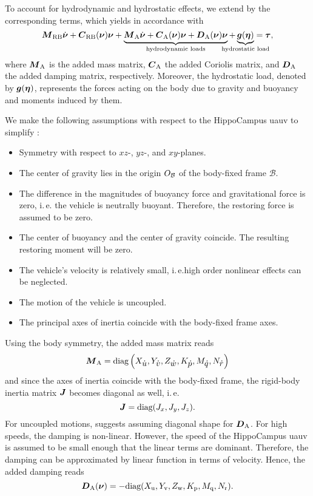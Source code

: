 To account for hydrodynamic and hydrostatic effects, we extend  by the corresponding terms, which yields in accordance with \cite{Fossen11}
\begin{equation}
	\label{eq:6dof-equation-of-motion}
	\Mrigid \nubp + \Crigid(\nub) \nub +
	\underbrace{
		\Madded \nubp +
		\Cadded(\nub) \nub +
		\Dadded(\nub) \nub
	}_\text{hydrodynamic loads}
	+ 
	\underbrace{
		\gb(\etab)
	}_\text{\makebox[0pt]{hydrostatic load}}
	= \taub
	,
\end{equation}
where $\mbox{$\bm{M}$}_\text{A}$ is the added mass matrix, $\mbox{$\bm{C}$}_\text{A}$ the added Coriolis matrix, and $\mbox{$\bm{D}$}_\text{A}$ the added damping matrix, respectively.
Moreover, the hydrostatic load, denoted by $\mbox{$\bm{g}$}(\mbox{$\bm{\eta}$})$, represents the forces acting on the body due to gravity and buoyancy and moments induced by them.

We make the following assumptions with respect to the HippoCampus \ac{uauv} to simplify :
\begin{itemize}
	\item Symmetry with respect to $xz$-, $yz$-, and $xy$-planes.
	\item The center of gravity lies in the origin $O_{\mathcal{B}}$ of the body-fixed frame $\mathcal{B}$.
	\item The difference in the magnitudes of buoyancy force and gravitational force is zero, i.\,e. the vehicle is neutrally buoyant. Therefore, the restoring force is assumed to be zero.
	\item The center of buoyancy and the center of gravity coincide. The resulting restoring moment will be zero.
	\item The vehicle's velocity is relatively small, i.\,e.high order nonlinear effects can be neglected.
	\item The motion of the vehicle is uncoupled.
	\item The principal axes of inertia coincide with the body-fixed frame axes.
\end{itemize}

Using the body symmetry, the added mass matrix reads %
\begin{equation}
	\mbox{$\bm{M}$}_\text{A} =
	\text{diag}\left(X_{\mbox{$\dot{u}$}}, Y_{\mbox{$\dot{v}$}}, Z_{\mbox{$\dot{w}$}}, K_{\mbox{$\dot{p}$}}, M_{\mbox{$\dot{q}$}}, N_{\mbox{$\dot{r}$}}\right)
\end{equation}
and since the axes of inertia coincide with the body-fixed frame, the rigid-body inertia matrix $\mbox{$\bm{J}$}$ becomes diagonal as well, i.\,e.
\begin{equation}
	\mbox{$\bm{J}$} = \text{diag}(J_x, J_y, J_z)
	.
\end{equation}
For uncoupled motions, \cite{Fossen11} suggests assuming diagonal shape for $\mbox{$\bm{D}$}_\text{A}$. For high speeds, the damping is non-linear. However, the speed of the HippoCampus \ac{uauv} is assumed to be small enough that the linear terms are dominant. Therefore, the damping can be approximated by linear function in terms of velocity.
Hence, the added damping reads
\begin{equation}
	\mbox{$\bm{D}$}_\text{A}(\mbox{$\bm{\nu}$}) = -\text{diag}(X_\text{u}, Y_\text{v}, Z_\text{w}, K_\text{p}, M_\text{q}, N_\text{r})
    .
\end{equation}

